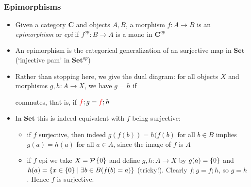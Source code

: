 \documentclass[handout]{beamer}
\newcommand{\bfsf}[1]{{\boldsymbol{#1}}}
\newcommand{\Set}{\bfsf{Set}}
\newcommand{\CC}{\bfsf{C}}
\begin{document}
\frame
  {   
    \frametitle{Epimorphisms}\label{Ch4:Epis}

 \begin{itemize}[<+->]
\item Given a category $\CC$ and objects $A,B$, a morphism $f: A\to B$ is an
\emph{epimorphism} or \emph{epi} if $f^{op}: B\to A$ is a mono in $\CC^{op}$
\item An epimorphism is the categorical generalization of an surjective map in $\Set$
({\color{red}`injective pam' in $\Set^{op}$})
\item Rather than stopping here, we give the dual diagram:
for all objects $X$ and morphisms $g,h: A\to X$, we have $g=h$ if  
 commutes, that is, if ${\color{red}f};g={\color{red}f};h$   %
\item In $\Set$ this is indeed equivalent with $f$ being surjective:
 \begin{itemize}
    \item if $f$ surjective, then indeed $g(f(b))=h(f(b)$ for all $b\in B$
      implies $g(a)=h(a)$ for all $a\in A$, since the image of $f$ is $A$
    \item if $f$ epi we take $X=\operatorname{\mathcal{P}}{\{0\}}$ and define $g,h: A\to X$ by $g(a)=\{0\}$
and {\color{red}$h(a)=\{ x\in\{0\}\mid \exists b\in B (f(b)=a)\}$ (tricky!).}
Clearly $f;g=f;h$, so $g=h$. Hence $f$ is surjective.
\end{itemize}
 \end{itemize}

 }
\end{document}
